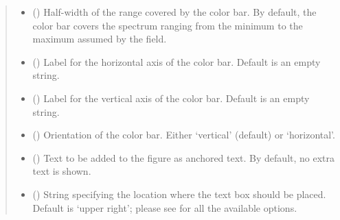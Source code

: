 \documentclass[letterpaper,10pt,english]{sphinxmanual}
\begin{document}
\begin{fulllineitems}
\begin{quote}
\begin{description}
\begin{itemize}
\item {} 
 () \textendash{} Half-width of the range covered by the color bar. By default, the color bar covers the spectrum
ranging from the minimum to the maximum assumed by the field.

\item {} 
 () \textendash{} Label for the horizontal axis of the color bar. Default is an empty string.

\item {} 
 () \textendash{} Label for the vertical axis of the color bar. Default is an empty string.

\item {} 
 () \textendash{} Orientation of the color bar. Either ‘vertical’ (default) or ‘horizontal’.

\item {} 
 () \textendash{} Text to be added to the figure as anchored text. By default, no extra text is shown.

\item {} 
 () \textendash{} String specifying the location where the text box should be placed. Default is ‘upper right’;
please see  for all the available options.

\end{itemize}

\end{description}\end{quote}

\end{fulllineitems}

\end{document}
